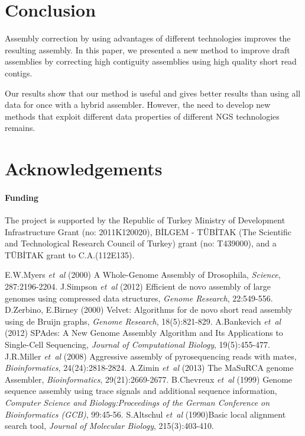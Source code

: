 \documentclass[12pt,a4paper]{cibb}
\begin{document}
\section{\bf Conclusion}

Assembly correction by using advantages of different technologies improves the resulting assembly. In this paper, we presented a new method to improve draft assemblies by correcting high contiguity assemblies using high quality short read contigs. 

Our results show that our method is useful and gives better results than using all data for once with a hybrid assembler. However, the need to develop new methods that exploit different data properties of different NGS technologies remains.

\section*{\bf Acknowledgements}
\paragraph{Funding\textcolon}
The project is supported by the Republic of Turkey Ministry of Development Infrastructure Grant (no: 2011K120020), B\.{I}LGEM \-- T\"{U}B\.{I}TAK (The Scientific and Technological Research Council of Turkey) grant (no: T439000), and a T\"{U}B\.{I}TAK grant to C.A.(112E135).\\




{\fontsize{10}{10}\selectfont
\begin{thebibliography}{99}
\setlength{\parskip}{0pt}

 E.W.Myers \textit{et~al} (2000) A Whole-Genome Assembly of Drosophila, \textit{Science}, {287}:2196-2204.
 J.Simpson \textit{et~al} (2012) Efficient de novo assembly of large genomes using compressed data structures, \textit{Genome Research}, {22}:549-556.
 D.Zerbino, E.Birney (2000) Velvet: Algorithms for de novo short read assembly using de Bruijn graphs, \textit{Genome Research}, {18(5)}:821-829.
 A.Bankevich {\it et~al} (2012) SPAdes: A New Genome Assembly Algorithm and Its Applications to Single-Cell Sequencing, \textit{Journal of Computational Biology}, {19(5)}:455-477.
 J.R.Miller \textit{et~al} (2008) Aggressive assembly of pyrosequencing reads with mates, \textit{Bioinformatics}, {24(24)}:2818-2824.
 A.Zimin \textit{et~al} (2013) The MaSuRCA genome Assembler, \textit{Bioinformatics}, {29(21)}:2669-2677.
 B.Chevreux {\it et~al} (1999) Genome sequence assembly using trace signals and additional sequence information, \textit{Computer Science and Biology:Proceedings of the German Conference on Bioinformatics (GCB)}, {99}:45-56.
 S.Altschul {\it et~al} (1990)Basic local alignment search tool, \textit{Journal of Molecular Biology}, {215(3)}:403-410.

\end{thebibliography}
}
\end{document}

